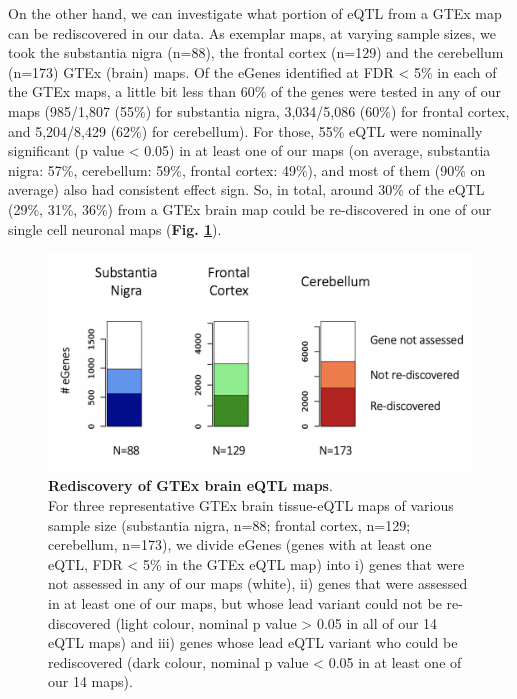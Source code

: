 
On the other hand,
we can investigate what portion of eQTL from a GTEx map can be rediscovered in our data.
As exemplar maps, at varying sample sizes, we took the substantia nigra (n=88), the frontal cortex (n=129) and the cerebellum (n=173) GTEx (brain) maps.
Of the eGenes identified at FDR < 5\% in each of the GTEx maps, a little bit less than 60\% of the genes were tested in any of our maps 
(985/1,807 (55\%) for substantia nigra,
3,034/5,086 (60\%) for frontal cortex, 
and 5,204/8,429 (62\%) for cerebellum).
For those, 55\% eQTL were nominally significant (p value < 0.05) in at least one of our maps (on average, substantia nigra: 57\%, cerebellum: 59\%, frontal cortex: 49\%), 
and most of them
(90\% on average) also had consistent effect sign. 
So, in total, around 30\% of the eQTL (29\%, 31\%, 36\%)
from a GTEx brain map could be re-discovered in one of our single cell neuronal maps (\textbf{Fig. \ref{fig:neuroseq_and_gtex_rediscovery}}).

\begin{figure}[h]
\centering
\includegraphics[width=16cm]{Chapter5/Fig/neuroseq_rediscovering_gtex_brain.png}
\caption[Rediscovery of GTEx brain eQTL maps]{\textbf{Rediscovery of GTEx brain eQTL maps}.\\
For three representative GTEx brain tissue-eQTL maps of various sample size (substantia nigra, n=88; frontal cortex, n=129; cerebellum, n=173), we divide eGenes (genes with at least one eQTL, FDR < 5\% in the GTEx eQTL map) into i) genes that were not assessed in any of our maps (white), ii) genes that were assessed in at least one of our maps, but whose lead variant could not be re-discovered (light colour, nominal p value > 0.05 in all of our 14 eQTL maps) and iii) genes whose lead eQTL variant who could be rediscovered (dark colour, nominal p value < 0.05 in at least one of our 14 maps).}
\label{fig:neuroseq_and_gtex_rediscovery}
\end{figure}

